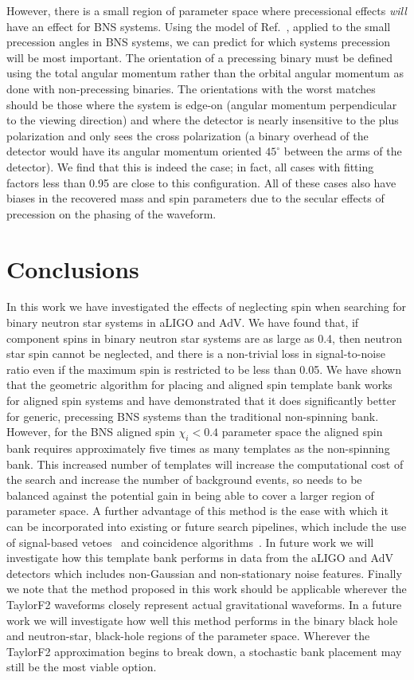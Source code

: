However, there is a small region of parameter space where precessional effects \textit{will}
have an effect for BNS systems.
Using the model of Ref.~\cite{Brown:2012gs}, applied to the small precession angles in BNS systems, 
we can predict for which systems precession will be most important.
The orientation of a precessing binary must be defined using the total angular momentum rather than the 
orbital angular momentum as done with non-precessing binaries. 
The orientations with the worst matches should be those where the system is edge-on 
(angular momentum perpendicular to the viewing direction) and where the detector is nearly insensitive 
to the plus polarization and only sees the cross polarization (a binary overhead of the detector would have 
its angular momentum oriented $45^{\circ}$ between the arms of the detector).
We find that
this is indeed the case; in fact, all cases with fitting factors less than 0.95 are close to
this configuration. All of these cases also have biases in the recovered mass and
spin parameters due to the secular effects of precession on the phasing of the waveform.

\section{Conclusions}

In this work we have investigated the effects of neglecting spin when
searching for binary neutron star systems in aLIGO and AdV. We have found
that, if component spins in binary neutron star systems are as large as 0.4,
then neutron star spin cannot be neglected, and there is a non-trivial loss in
signal-to-noise ratio even if the maximum spin is restricted to be less than
0.05. We have shown that the
geometric algorithm for placing and aligned spin template bank works for
aligned spin systems and have demonstrated that it does significantly better
for generic, precessing BNS systems than the traditional non-spinning bank.
However, for the BNS aligned spin $\chi_i < 0.4$ parameter space the aligned
spin bank requires approximately five times as many templates as the
non-spinning bank. This increased number of templates will increase the
computational cost of the search and increase the number of background events,
so needs to be balanced against the potential gain in being able to cover a
larger region of parameter space. A further advantage of this method is the ease
with which it can be incorporated into existing or future search
pipelines, which include the use of signal-based vetoes~\cite{Allen:2004gu}
and coincidence algorithms~\cite{Robinson:2008}. In future work we will
investigate how this template bank performs in data from the aLIGO and AdV
detectors which includes non-Gaussian and non-stationary noise features.
Finally we note that the method proposed in this work should be applicable
wherever the TaylorF2 waveforms closely represent actual gravitational
waveforms. In a future work we will investigate how well this method performs
in the binary black hole and neutron-star, black-hole regions of the parameter space.
Wherever the TaylorF2 approximation begins to break down, a stochastic
bank placement may still be the most viable option.
